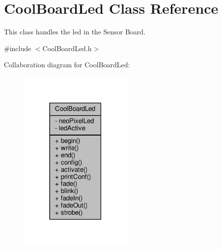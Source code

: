 \hypertarget{class_cool_board_led}{}\section{Cool\+Board\+Led Class Reference}
\label{class_cool_board_led}


This class handles the led in the Sensor Board.  




{\ttfamily \#include $<$Cool\+Board\+Led.\+h$>$}



Collaboration diagram for Cool\+Board\+Led\+:\nopagebreak
\begin{figure}[H]
\begin{center}
\leavevmode
\includegraphics[width=158pt]{d4/d22/class_cool_board_led__coll__graph}
\end{center}
\end{figure}

